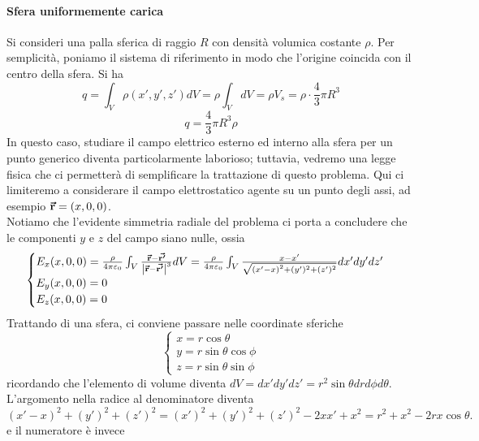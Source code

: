 \paragraph{Sfera uniformemente carica}%
Si consideri una palla sferica di raggio $R$ con densità volumica costante $\rho$. Per semplicità, poniamo il sistema di riferimento in modo che l'origine coincida con il centro della sfera. Si ha
\begin{equation*}
	q=\int_{V}\rho(x',y',z')dV=\rho\int_{V}dV=\rho V_s=\rho \cdot \frac{4}{3}\pi R^3
\end{equation*}
\begin{equation}
	q=\frac{4}{3}\pi R^3\rho
\end{equation}
In questo caso, studiare il campo elettrico esterno ed interno alla sfera per un punto generico diventa particolarmente laborioso; tuttavia, vedremo una legge fisica che ci permetterà di semplificare la trattazione di questo problema. Qui ci limiteremo a considerare il campo elettrostatico agente su un punto degli assi, ad esempio $\vb*{\va{r}}=\left(x,0,0\right)$.\\
Notiamo che l'evidente simmetria radiale del problema ci porta a concludere che le componenti $y$ e $z$ del campo siano nulle, ossia
\begin{equation*}
	\begin{cases}
		E_x(x,0,0)=\frac{\rho}{4\pi\varepsilon_0}\int_V\frac{\vb*{\va{r}}-\vb*{\va{r'}}}{\abs{\vb*{\va{r}}-\vb*{\va{r'}}}^3}dV=\frac{\rho}{4\pi\varepsilon_0}\int_V\frac{x-x'}{\sqrt{\left(x'-x\right)^2+(y')^2+(z')^2}}dx'dy'dz'\\
		E_y(x,0,0)=0\\
		E_z(x,0,0)=0
	\end{cases}
\end{equation*}
Trattando di una sfera, ci conviene passare nelle coordinate sferiche
\begin{equation*}
	\begin{cases}
		x=r\cos\theta\\
		y=r\sin\theta\cos\phi\\
		z=r\sin\theta\sin\phi
	\end{cases}
\end{equation*}
ricordando che l'elemento di volume diventa $dV=dx'dy'dz'=r^2\sin\theta drd\phi d\theta$. L'argomento nella radice al denominatore diventa
\begin{equation*}
	\left(x'-x\right)^2+(y')^2+(z')^2=(x')^2+(y')^2+(z')^2-2xx'+x^2=r^2+x^2-2rx\cos\theta.
\end{equation*}
e il numeratore è invece
